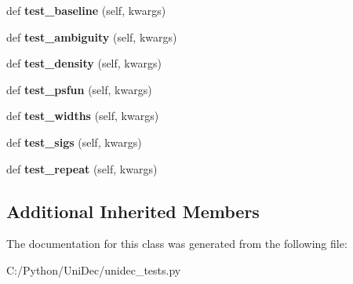 \begin{DoxyCompactItemize}
\item 
\hypertarget{class_uni_dec_1_1unidec__tests_1_1_uni_dec_test_adc49f889bc5a4861ddf5c4b30f661581}{}def {\bfseries test\+\_\+baseline} (self, kwargs)\label{class_uni_dec_1_1unidec__tests_1_1_uni_dec_test_adc49f889bc5a4861ddf5c4b30f661581}

\item 
\hypertarget{class_uni_dec_1_1unidec__tests_1_1_uni_dec_test_ab578ac2a5f0a210fee631b70e3a53373}{}def {\bfseries test\+\_\+ambiguity} (self, kwargs)\label{class_uni_dec_1_1unidec__tests_1_1_uni_dec_test_ab578ac2a5f0a210fee631b70e3a53373}

\item 
\hypertarget{class_uni_dec_1_1unidec__tests_1_1_uni_dec_test_a465e17d26a5d0f7b2efd779deb232fb4}{}def {\bfseries test\+\_\+density} (self, kwargs)\label{class_uni_dec_1_1unidec__tests_1_1_uni_dec_test_a465e17d26a5d0f7b2efd779deb232fb4}

\item 
\hypertarget{class_uni_dec_1_1unidec__tests_1_1_uni_dec_test_a661ad3a27086e8a2ac1b512a86c0f4d3}{}def {\bfseries test\+\_\+psfun} (self, kwargs)\label{class_uni_dec_1_1unidec__tests_1_1_uni_dec_test_a661ad3a27086e8a2ac1b512a86c0f4d3}

\item 
\hypertarget{class_uni_dec_1_1unidec__tests_1_1_uni_dec_test_a17497d7c058ecb982108ecd07eea55ac}{}def {\bfseries test\+\_\+widths} (self, kwargs)\label{class_uni_dec_1_1unidec__tests_1_1_uni_dec_test_a17497d7c058ecb982108ecd07eea55ac}

\item 
\hypertarget{class_uni_dec_1_1unidec__tests_1_1_uni_dec_test_a34808b3417fbfe04fd514907371c1822}{}def {\bfseries test\+\_\+sigs} (self, kwargs)\label{class_uni_dec_1_1unidec__tests_1_1_uni_dec_test_a34808b3417fbfe04fd514907371c1822}

\item 
\hypertarget{class_uni_dec_1_1unidec__tests_1_1_uni_dec_test_a80f4b1c8258f43c765d9f0832c5bac91}{}def {\bfseries test\+\_\+repeat} (self, kwargs)\label{class_uni_dec_1_1unidec__tests_1_1_uni_dec_test_a80f4b1c8258f43c765d9f0832c5bac91}

\end{DoxyCompactItemize}
\subsection*{Additional Inherited Members}


The documentation for this class was generated from the following file\+:\begin{DoxyCompactItemize}
\item 
C\+:/\+Python/\+Uni\+Dec/unidec\+\_\+tests.\+py\end{DoxyCompactItemize}
